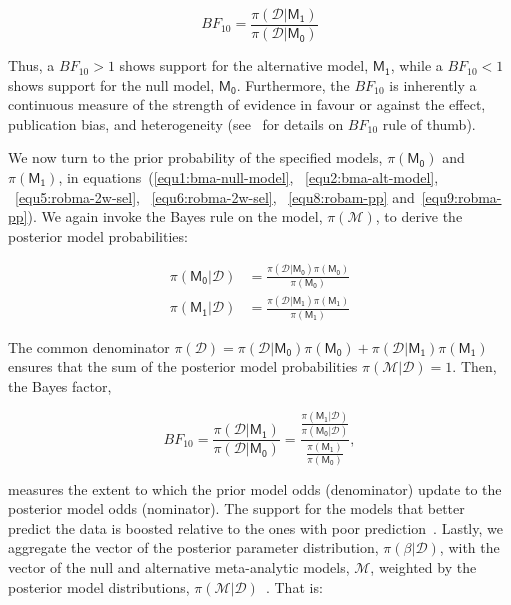 \documentclass[a4paper, 12pt]{article}
\begin{document}
    \begin{equation}
        \label{equ12:bayes-factor}
        BF_{10}=\frac{\pi(\mathcal{D}|\mathsf{M_1})}{\pi(\mathcal{D}|\mathsf{M_0})}
    \end{equation}

    Thus, a $BF_{10}>1$ shows support for the alternative model, $\mathsf{M_1}$, while a $BF_{10}<1$ shows support for the null model, $\mathsf{M_0}$. Furthermore, the $BF_{10}$ is inherently a continuous measure of the strength of evidence in favour or against the effect, publication bias, and heterogeneity (see~\parencites{bartos2022, leewagenmakers2013, jeffreys1998} for details on $BF_{10}$ rule of thumb).

    We now turn to the prior probability of the specified models, $\pi(\mathsf{M_0})$ and $\pi(\mathsf{M_1})$, in equations~(\ref{equ1:bma-null-model}, ~\ref{equ2:bma-alt-model}, ~\ref{equ5:robma-2w-sel}, ~\ref{equ6:robma-2w-sel}, ~\ref{equ8:robam-pp} and~\ref{equ9:robma-pp}). We again invoke the Bayes rule on the model, $\pi(\mathcal{M})$, to derive the posterior model probabilities:

    \begin{align}
        \pi(\mathsf{M_0} | \mathcal{D}) &= \frac{\pi(\mathcal{D} | \mathsf{M_0})\pi(\mathsf{M_0})}{\pi(\mathsf{M_0})} \label{equ13} \\
        \pi(\mathsf{M_1} | \mathcal{D}) &= \frac{\pi(\mathcal{D} | \mathsf{M_1})\pi(\mathsf{M_1})}{\pi(\mathsf{M_1})} \label{equ14}
    \end{align}

    The common denominator $\pi(\mathcal{D}) = \pi(\mathcal{D} | \mathsf{M_0})\pi(\mathsf{M_0}) + \pi(\mathcal{D} | \mathsf{M_1})\pi(\mathsf{M_1})$ ensures that the sum of the posterior model probabilities $\pi(\mathcal{M} | \mathcal{D}) = 1$. Then, the Bayes factor,

    \begin{equation}
        \label{equ15:Bayes-Factor}
        BF_{10} = \frac{\pi(\mathcal{D} | \mathsf{M_1})}{\pi(\mathcal{D} | \mathsf{M_0})} = \dfrac{\frac{\pi(\mathsf{M_1} | \mathcal{D})}{\pi(\mathsf{M_0} | \mathcal{D})}}{\frac{\pi(\mathsf{M_1})}{\pi(\mathsf{M_0})}},
    \end{equation}

    measures the extent to which the prior model odds (denominator) update to the posterior model odds (nominator). The support for the models that better predict the data is boosted relative to the ones with poor prediction~\parencites{roudermorey2019, wagenmakers2016}. Lastly, we aggregate the vector of the posterior parameter distribution, $\pi(\beta | \mathcal{D})$, with the vector of the null and alternative meta-analytic models, $\mathcal{M}$, weighted by the posterior model distributions, $\pi(\mathcal{M}|\mathcal{D})$~\parencites{jeffreys1935, wrinchjeffreys1921}. That is:
\end{document}
